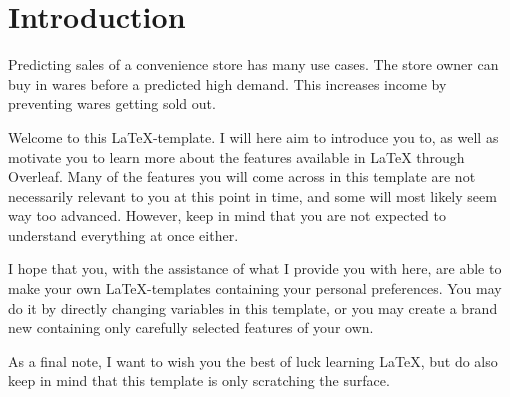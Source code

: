 

\section{Introduction}
Predicting sales of a convenience store has many use cases. The store owner can buy in wares before a predicted high demand. This increases income by preventing wares getting sold out.
\newline




Welcome to this \LaTeX-template. I will here aim to introduce you to, as well as motivate you to learn more about the features available in LaTeX through Overleaf. Many of the features you will come across in this template are not necessarily relevant to you at this point in time, and some will most likely seem way too advanced. However, keep in mind that you are not expected to understand everything at once either.

I hope that you, with the assistance of what I provide you with here, are able to make your own LaTeX-templates containing your personal preferences. You may do it by directly changing variables in this template, or you may create a brand new containing only carefully selected features of your own. 

As a final note, I want to wish you the best of luck learning LaTeX, but do also keep in mind that this template is only scratching the surface.

\nocite{imt_software_wiki}  %